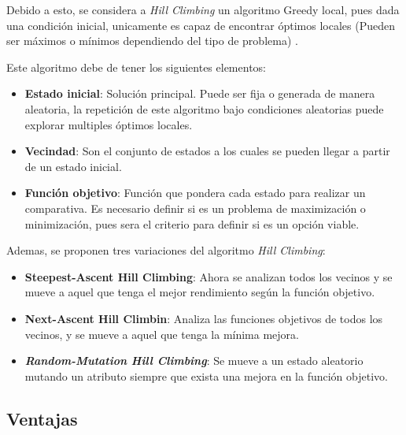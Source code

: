 \documentclass[12pt,twoside]{article}
\begin{document}
	Debido a esto, se considera a \textit{Hill Climbing} un algoritmo Greedy local, pues dada una condición inicial, unicamente es capaz de encontrar óptimos locales (Pueden ser máximos o mínimos dependiendo del tipo de problema) \cite{1}.
	
	Este algoritmo debe de tener los siguientes elementos:
	\begin{itemize}
		\item \textbf{Estado inicial}: Solución principal. Puede ser fija o generada de manera aleatoria, la repetición de este algoritmo bajo condiciones aleatorias puede explorar multiples óptimos locales.
		\item \textbf{Vecindad}: Son el conjunto de estados a los cuales se pueden llegar a partir de un estado inicial.
		\item  \textbf{Función objetivo}: Función que pondera cada estado para realizar un comparativa. Es necesario definir si es un problema de maximización o minimización, pues sera el criterio para definir si es un opción viable. 
	\end{itemize}
	
	Ademas, se proponen tres variaciones del algoritmo \textit{Hill Climbing}:
	\begin{itemize}
		\item \textbf{Steepest-Ascent Hill Climbing}: Ahora se analizan todos los vecinos y se mueve a aquel que tenga el mejor rendimiento según la función objetivo.
		\item \textbf{Next-Ascent Hill Climbin}: Analiza las funciones objetivos de todos los vecinos, y se mueve a aquel que tenga la mínima mejora.
		\item \textit{\textbf{Random-Mutation Hill Climbing}}: Se mueve a un estado aleatorio mutando un atributo siempre que exista una mejora en la función objetivo.
	\end{itemize}
	
	
	\subsection{Ventajas}
	
\end{document}
